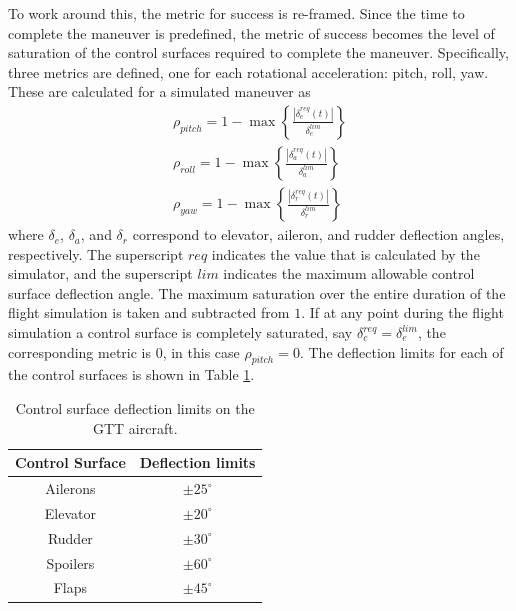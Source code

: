 To work around this, the metric for success is re-framed. 
Since the time to complete the maneuver is predefined, the metric of success becomes the level of saturation of the control surfaces required to complete the maneuver. 
Specifically, three metrics are defined, one for each rotational acceleration: pitch, roll, yaw. 
These are calculated for a simulated maneuver as
\begin{align}
    \rho_{pitch} = 1- \max\left \{ \frac{\left \vert \delta_e^{req}(t) \right \vert }{\delta_e^{lim}} \right \}
    \\
    \rho_{roll} = 1- \max\left \{ \frac{\left \vert \delta_a^{req}(t) \right \vert }{\delta_a^{lim}} \right \}
    \\
    \rho_{yaw} = 1- \max\left \{ \frac{\left \vert \delta_r^{req}(t) \right \vert }{\delta_r^{lim}} \right \}
\end{align}
where $\delta_e$, $\delta_a$, and $\delta_r$ correspond to elevator, aileron, and rudder deflection angles, respectively.
The superscript $req$ indicates the value that is calculated by the simulator, and the superscript $lim$ indicates the maximum allowable control surface deflection angle. 
The maximum saturation over the entire duration of the flight simulation is taken and subtracted from $1$.
If at any point during the flight simulation a control surface is completely saturated, say $\delta_e^{req} = \delta_e^{lim}$, the corresponding metric is $0$, in this case $\rho_{pitch} = 0$.
The deflection limits for each of the control surfaces is shown in Table \ref{tab:gtt_defl_limits}.

\begin{table}
\centering
    \renewcommand{\arraystretch}{1.2}
    \captionsetup{justification=centering}
    \caption{Control surface deflection limits on the GTT aircraft.} 
    \begin{tabular}{|c|c|}
    \hline
        Control Surface & Deflection limits \\ \hline
        Ailerons & $\pm 25^\circ$ \\ \hline
        Elevator & $\pm 20^\circ$ \\ \hline
        Rudder & $\pm 30^\circ$ \\ \hline
        Spoilers & $\pm 60^\circ$ \\ \hline
        Flaps & $\pm 45^\circ$ \\ \hline
    \end{tabular}
    \label{tab:gtt_defl_limits}
\end{table}

